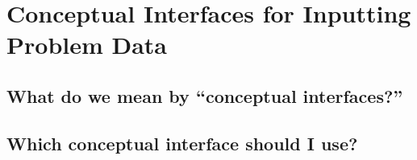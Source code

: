 \chapter{Conceptual Interfaces for Inputting Problem Data}
\label{Conceptual Interfaces}

\section{What do we mean by ``conceptual interfaces?''}

\section{Which conceptual interface should I use?}


